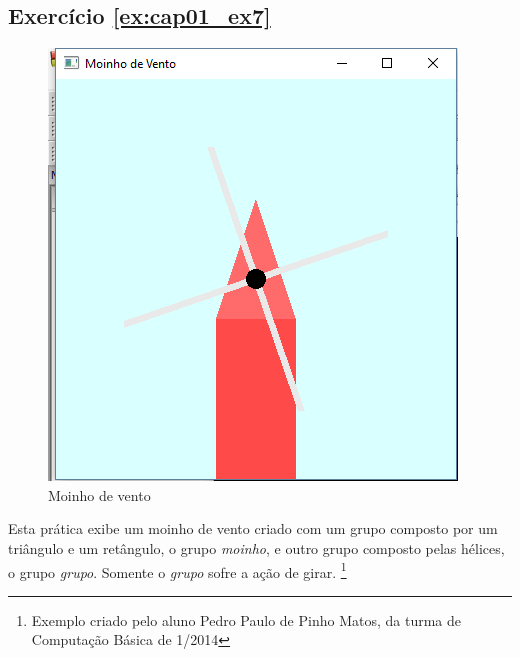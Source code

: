 \subsection*{Exercício \ref{ex:cap01_ex7}}
\begin{figure}[ht]
  \centerline{\includegraphics[width=.5\textwidth]{img/cap1_ex7.png}}
  \caption{Moinho de vento}
  \label{fig:cap01_ex7}
\end{figure}
Esta prática exibe um moinho de vento criado com um grupo composto por um triângulo e um retângulo, o grupo \emph{moinho}, e outro grupo composto pelas hélices, o grupo \emph{grupo}. Somente o \emph{grupo} sofre a ação de girar. \footnote{Exemplo criado pelo aluno Pedro Paulo de Pinho Matos, da turma de Computação Básica de 1/2014}

